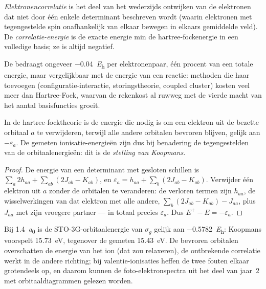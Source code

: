 \begin{definition}\label{def:b3:computational-chemistry:correlation}
\emph{Elektronencorrelatie} is het deel van het
wederzijds ontwijken van de elektronen dat niet door één enkele
determinant beschreven wordt (waarin elektronen met tegengestelde spin
onafhankelijk van elkaar bewegen in elkaars gemiddelde veld). De
\emph{correlatie-energie} is de exacte
energie min de hartree-fockenergie in een volledige basis; ze is altijd
negatief.
\end{definition}

De  bedraagt ongeveer \qty{-0.04}{\hartree} per
elektronenpaar, één procent van een totale energie, maar vergelijkbaar met
de energie van een reactie: methoden die haar toevoegen
(configuratie-interactie, storingstheorie, coupled cluster) kosten veel
meer dan Hartree-Fock, waarvan de rekenkost al ruwweg met de vierde macht
van het aantal basisfuncties groeit.

\begin{theorem}\label{thm:b3:computational-chemistry:koopmans}
In de hartree-focktheorie is de energie die nodig is om een elektron uit
de bezette orbitaal $a$ te verwijderen, terwijl alle andere orbitalen
bevroren blijven, gelijk aan $-\varepsilon_a$. De
gemeten ionisatie-energieën zijn dus bij benadering de tegengestelden van
de orbitaalenergieën: dit is de
\emph{stelling van Koopmans}.
\end{theorem}

\begin{proof}
De energie van een determinant met gesloten schillen is $\sum_a2h_{aa} + \sum_{ab}(2J_{ab} -
K_{ab})$, en $\varepsilon_a = h_{aa} + \sum_b(2J_{ab} - K_{ab})$. Verwijder één
elektron uit $a$ zonder de orbitalen te veranderen: de verloren termen zijn
$h_{aa}$, de wisselwerkingen van dat elektron met alle andere,
$\sum_b(2J_{ab} - K_{ab}) -
J_{aa}$, plus $J_{aa}$ met zijn vroegere partner --- in totaal precies
$\varepsilon_a$. Dus $E^+ - E = -\varepsilon_a$.
\end{proof}

\begin{example}[\ce{H2} ioniseren]\label{ex:b3:computational-chemistry:koopmans}
Bij \qty{1.4}{\bohr} is de STO-3G-orbitaalenergie van $\sigma_g$ gelijk aan
\qty{-0.5782}{\hartree}: Koopmans voorspelt \qty{15.73}{eV}, tegenover de
gemeten \qty{15.43}{eV}. De bevroren orbitalen overschatten de energie van
het ion (dat zou relaxeren), de ontbrekende correlatie werkt in de andere
richting; bij valentie-ionisaties heffen de twee fouten elkaar grotendeels
op, en daarom kunnen de foto-elektronspectra uit het deel van jaar~2 met
orbitaaldiagrammen gelezen worden.
\end{example}

